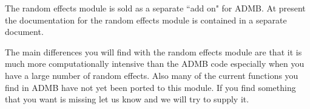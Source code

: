 %
%

The random effects module is sold as a separate ``add on"
for ADMB.
At present the documentation for the random effects module is
contained in a separate document.

The main differences you will find with the random effects module are
that it is much more computationally intensive than the 
ADMB code especially when you have a large number of random effects.
Also many of the current functions you find in ADMB have not yet been ported to this module. If you find something that you want is missing let us know 
and we will try to supply it.
